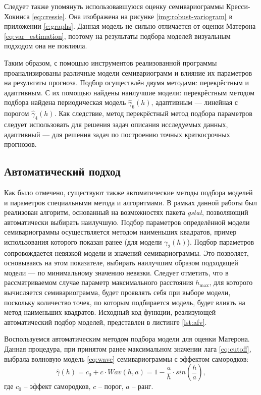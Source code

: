 Следует также упомянуть использовавшуюся оценку семивариограммы Кресси-Хокинса \eqref{eq:cressie}. Она изображена на рисунке \ref{img:robust-variogram} в приложении \ref{c:graphs}. Данная модель не сильно отличается от оценки Матерона \eqref{eq:var_estimation}, поэтому на результаты подбора моделей визуальным подходом она не повлияла.

Таким образом, с помощью инструментов реализованной программы проанализированы различные модели семивариограмм и влияние их параметров на результаты прогноза. Подбор осуществлён двумя методами: перекрёстным и адаптивным. С их помощью найдены наилучшие модели: перекрёстным методом подбора найдена периодическая модель $ \widehat{\gamma}_6(h) $, адаптивным --- линейная с порогом $ \widehat{\gamma}_4(h) $. Как следствие, метод перекрёстный метод подбора параметров следует использовать для решения задач описания исследуемых данных, адаптивный --- для решения задач по построению точных краткосрочных прогнозов.


\subsection{Автоматический подход} %
\label{sec:autovar}


Как было отмечено, существуют также автоматические методы подбора моделей и параметров специальными метода и алгоритмами. В рамках данной работы был реализован алгоритм, основанный на возможностях пакета \textit{gstat}, позволяющий автоматически выбирать наилучшую. Подбор параметров определённой модели семивариограммы осуществляется методом наименьших квадратов, пример использования которого показан ранее (для модели $ \gamma_2(h) $). Подбор параметров сопровождается невязкой модели и значений семивариограммы. Это позволяет, основываясь на этом показателе, выбирать наилучшим образом подходящей модели --- по минимальному значению невязки. Следует отметить, что в рассматриваемом случае параметр максимального расстояния $ h_{\text{max}} $, для которого вычисляется семивариограмма, будет проявлять себя при выборе модели, поскольку количество точек, по которым подбирается модель, будет влиять на метод наименьших квадратов. Исходный код функции, реализующей автоматический подбор моделей, представлен в листинге \ref{lst:afv}.

Воспользуемся автоматическим методом подбора модели для оценки Матерона. Данная процедура, при принятом ранее максимальном значении лага \eqref{eq:cutoff}, выбрала волновую модель \eqref{eq:wave} семивариограммы с эффектом самородков:
\begin{equation}
\label{eq:wave}
	\widehat{\gamma}(h) = c_0 + c \cdot Wav(h, a) = 1 - \frac{a}{h} \cdot sin(\frac{h}{a}),
\end{equation}
где $ c_0 $ -- эффект самородков, $ c $ -- порог, $ a $ -- ранг.

